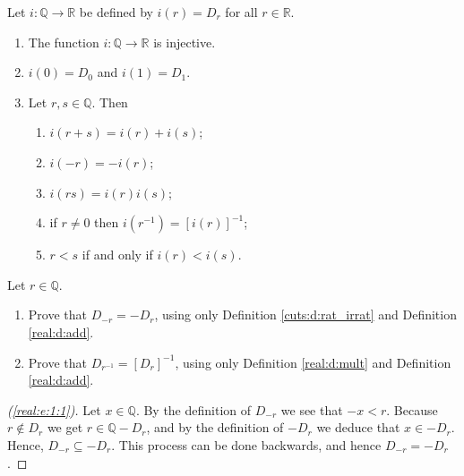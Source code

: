 \begin{theorem} %
	\label{real:t:rat}
	Let $i: \mathbb{Q} \to \mathbb{R}$ be defined by $i(r) = D_r$ for all $r \in \mathbb{R}$.
	\begin{enumerate}
		\item \label{real:t:rat:1}
		      The function $i: \mathbb{Q} \to \mathbb{R}$ is injective.
		\item \label{real:t:rat:2}
		      $i(0) = D_0$ and $i(1) = D_1$.
		\item \label{real:t:rat:3}
		      Let $r, s \in \mathbb{Q}$. Then
		      \begin{enumerate}
			      \item \label{real:t:rat:3:1}
			            $i(r + s)=i(r) + i(s)$;
			      \item \label{real:t:rat:3:2}
			            $i(-r) = -i(r)$;
			      \item \label{real:t:rat:3:3}
			            $i(r s) = i(r) i(s)$;
			      \item \label{real:t:rat:3:4}
			            if $r \neq 0$ then $i(r^{-1}) = [i(r)]^{-1}$;
			      \item \label{real:t:rat:3:5}
			            $r < s$ if and only if $i(r) < i(s)$.
		      \end{enumerate}
	\end{enumerate}
\end{theorem}


\Newpage
\begin{exercise} %
	\label{real:e:1}
	Let $r \in \mathbb{Q}$.
	\begin{enumerate}
		\item \label{real:e:1:1}
		      Prove that $D_{-r} = -D_r$, using only Definition \ref{cuts:d:rat_irrat} and Definition \ref{real:d:add}.
		\item \label{real:e:1:2}
		      Prove that $D_{r^{-1}} = [D_r]^{-1}$, using only Definition \ref{real:d:mult} and Definition \ref{real:d:add}.
	\end{enumerate}
\end{exercise}

\begin{proof}[(\ref{real:e:1:1})]
	Let $x \in \mathbb{Q}$. By the definition of $D_{-r}$ we see that $-x < r$. Because $r \notin D_r$ we get $r \in \mathbb{Q} - D_{r}$, and by the definition of $-D_r$ we deduce that $x \in -D_r$. Hence, $D_{-r} \subseteq -D_r$. This process can be done backwards, and hence $D_{-r} = -D_r$.
\end{proof}

